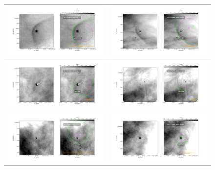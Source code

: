 \begin{figure}[htp]
\centering
\begin{tabular}{|l|l|}
  \hline
   \includegraphics[width=0.47\linewidth,  trim=60 50 100 50, clip]{j8oc01010_wcs/w069-601-Bally_01-images.pdf}
   &\includegraphics[width=0.47\linewidth,  trim=60 50 100 50, clip]{j8oc01010_wcs/w073-227-Bally_01-images.pdf}\\ \hline
    \includegraphics[width=0.47\linewidth,  trim=60 50 100 50, clip]{j8oc01010_wcs/142-301-Bally_01-images.pdf}
    &\includegraphics[width=0.47\linewidth,  trim=60 50 100 50, clip]{j8oc02010_wcs/131-046-Bally_02-images.pdf}\\ \hline
    \includegraphics[width=0.47\linewidth,  trim=60 50 100 50, clip]{j8oc02010_wcs/132-053-Bally_02-images.pdf}
   &\includegraphics[width=0.47\linewidth,  trim=60 50 100 50, clip]{j8oc02010_wcs/206-043-Bally_02-images.pdf}\\  \hline

\end{tabular}
\end{figure}

